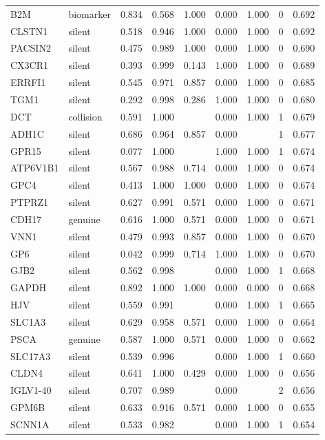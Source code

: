 \begin{longtable}{llrrrrrrr}
B2M & biomarker & 0.834 & 0.568 & 1.000 & 0.000 & 1.000 & 0 & 0.692\\
CLSTN1 & silent & 0.518 & 0.946 & 1.000 & 0.000 & 1.000 & 0 & 0.692\\
PACSIN2 & silent & 0.475 & 0.989 & 1.000 & 0.000 & 1.000 & 0 & 0.690\\
CX3CR1 & silent & 0.393 & 0.999 & 0.143 & 1.000 & 1.000 & 0 & 0.689\\
ERRFI1 & silent & 0.545 & 0.971 & 0.857 & 0.000 & 1.000 & 0 & 0.685\\
TGM1 & silent & 0.292 & 0.998 & 0.286 & 1.000 & 1.000 & 0 & 0.680\\
DCT & collision & 0.591 & 1.000 &  & 0.000 & 1.000 & 1 & 0.679\\
ADH1C & silent & 0.686 & 0.964 & 0.857 & 0.000 &  & 1 & 0.677\\
GPR15 & silent & 0.077 & 1.000 &  & 1.000 & 1.000 & 1 & 0.674\\
ATP6V1B1 & silent & 0.567 & 0.988 & 0.714 & 0.000 & 1.000 & 0 & 0.674\\
GPC4 & silent & 0.413 & 1.000 & 1.000 & 0.000 & 1.000 & 0 & 0.674\\
PTPRZ1 & silent & 0.627 & 0.991 & 0.571 & 0.000 & 1.000 & 0 & 0.671\\
CDH17 & genuine & 0.616 & 1.000 & 0.571 & 0.000 & 1.000 & 0 & 0.671\\
VNN1 & silent & 0.479 & 0.993 & 0.857 & 0.000 & 1.000 & 0 & 0.670\\
GP6 & silent & 0.042 & 0.999 & 0.714 & 1.000 & 1.000 & 0 & 0.670\\
GJB2 & silent & 0.562 & 0.998 &  & 0.000 & 1.000 & 1 & 0.668\\
GAPDH & silent & 0.892 & 1.000 & 1.000 & 0.000 & 0.000 & 0 & 0.668\\
HJV & silent & 0.559 & 0.991 &  & 0.000 & 1.000 & 1 & 0.665\\
SLC1A3 & silent & 0.629 & 0.958 & 0.571 & 0.000 & 1.000 & 0 & 0.664\\
PSCA & genuine & 0.587 & 1.000 & 0.571 & 0.000 & 1.000 & 0 & 0.662\\
SLC17A3 & silent & 0.539 & 0.996 &  & 0.000 & 1.000 & 1 & 0.660\\
CLDN4 & silent & 0.641 & 1.000 & 0.429 & 0.000 & 1.000 & 0 & 0.656\\
IGLV1-40 & silent & 0.707 & 0.989 &  & 0.000 &  & 2 & 0.656\\
GPM6B & silent & 0.633 & 0.916 & 0.571 & 0.000 & 1.000 & 0 & 0.655\\
SCNN1A & silent & 0.533 & 0.982 &  & 0.000 & 1.000 & 1 & 0.654\\

\end{longtable}
